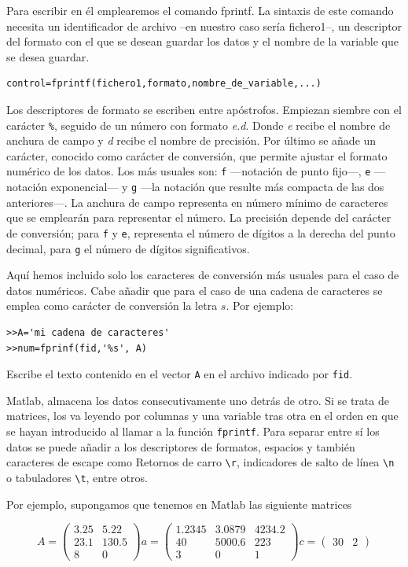 Para escribir en él emplearemos el comando fprintf. La sintaxis de este comando necesita un identificador de archivo --en nuestro caso sería fichero1--, un descriptor del formato con el que se desean guardar los datos y el nombre de la variable que se desea guardar.
\begin{verbatim}
control=fprintf(fichero1,formato,nombre_de_variable,...)
\end{verbatim} 
Los descriptores de formato se escriben entre apóstrofos. Empiezan siembre con el carácter \texttt{\%}, seguido de un número con formato \emph{e.d}. Donde \emph{e} recibe el nombre de anchura de campo  y \emph{d} recibe el nombre de precisión. Por último se añade un carácter, conocido como carácter de conversión, que permite ajustar el formato numérico de los datos. Los más usuales son: \texttt{f} ---notación de punto fijo---, \texttt{e} ---notación exponencial--- y \texttt{g} ---la notación que resulte más compacta de las dos anteriores---.  La anchura de campo representa en número mínimo de caracteres que se emplearán para representar el número.  La precisión depende del carácter de conversión; para \texttt{f} y  \texttt{e}, representa el número de dígitos  a la derecha del punto decimal, para  \texttt{g} el número de dígitos significativos.

Aquí hemos incluido solo los caracteres de conversión más usuales para el caso de datos numéricos. Cabe añadir que para el caso de una cadena de caracteres se emplea como carácter de conversión la letra $s$.  Por ejemplo:

\begin{verbatim}
>>A='mi cadena de caracteres'
>>num=fprinf(fid,'%s', A)
\end{verbatim}
Escribe  el texto contenido en el vector \texttt{A} en el archivo indicado por \texttt{fid}.
 
Matlab, almacena los datos consecutivamente uno detrás de otro. Si se trata de matrices, los va leyendo por columnas y una variable tras otra en el orden en que se hayan introducido al llamar a la función \texttt{fprintf}. Para separar entre sí los datos se puede añadir a los descriptores de formatos, espacios y también caracteres de escape como Retornos de carro \texttt{\textbackslash r}, indicadores de salto de línea \texttt{\textbackslash n} o tabuladores \texttt{\textbackslash t}, entre otros.

Por ejemplo, supongamos que tenemos en Matlab las siguiente matrices

 \begin{equation*}
 A=
 \begin{pmatrix}
3.25&5.22\\
23.1&130.5\\
8&0
\end{pmatrix}
a=
\begin{pmatrix}
1.2345&3.0879&4234.2\\
40&5000.6&223\\
3&0&1
\end{pmatrix}
c=
\begin{pmatrix}
30&2
\end{pmatrix}
\end{equation*}

